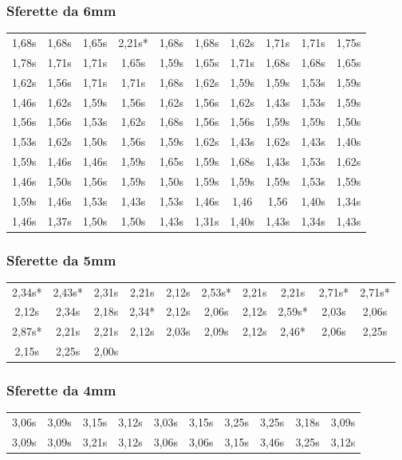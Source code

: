 \documentclass[a4paper,10pt]{report}
\begin{document}
\subsubsection{Sferette da 6mm}
\begin{tabular}{|c|c|c|c|c|c|c|c|c|c|}
\toprule
 1,68s & 1,68s & 1,65s & 2,21s* & 1,68s & 1,68s & 1,62s & 1,71s & 1,71s & 1,75s \\
 1,78s & 1,71s & 1,71s & 1,65s & 1,59s  & 1,65s  & 1,71s  & 1,68s & 1,68s & 1,65s \\
\midrule
 1,62s & 1,56s & 1,71s & 1,71s & 1,68s & 1,62s & 1,59s & 1,59s & 1,53s & 1,59s \\
 1,46s & 1,62s & 1,59s & 1,56s & 1,62s & 1,56s & 1,62s & 1,43s & 1,53s & 1,59s \\
\midrule
 1,56s & 1,56s & 1,53s & 1,62s & 1,68s & 1,56s & 1,56s & 1,59s & 1,59s & 1,50s\\
 1,53s & 1,62s & 1,50s & 1,56s & 1,59s & 1,62s & 1,43s & 1,62s & 1,43s & 1,40s \\
\midrule
 1,59s & 1,46s & 1,46s & 1,59s & 1,65s & 1,59s & 1,68s & 1,43s & 1,53s & 1,62s \\
 1,46s & 1,50s & 1,56s & 1,59s & 1,50s & 1,59s  & 1,59s & 1,59s & 1,53s & 1,59s \\
\midrule
1,59s & 1,46s & 1,53s & 1,43s & 1,53s & 1,46s & 1,46 & 1,56 & 1,40s & 1,34s \\
1,46s & 1,37s  & 1,50s   & 1,50s  & 1,43s & 1,31s & 1,40s  & 1,43s  & 1,34s & 1,43s \\
\bottomrule
\end{tabular}
\subsubsection{Sferette da 5mm}
\begin{tabular}{|c|c|c|c|c|c|c|c|c|c|}
\toprule
 2,34s* & 2,43s* & 2,31s & 2,21s & 2,12s & 2,53s* & 2,21s & 2,21s & 2,71s* & 2,71s* \\
 2,12s & 2,34s & 2,18s & 2,34* & 2,12s & 2,06s & 2,12s & 2,59s* & 2,03s & 2,06s \\
\midrule
 2,87s* & 2,21s & 2,21s & 2,12s & 2,03s & 2,09s & 2,12s & 2,46* & 2,06s & 2,25s \\
 2,15s & 2,25s & 2,00s &  &  &  &  &  &  & \\
\bottomrule
\end{tabular}
\subsubsection{Sferette da 4mm}
\begin{tabular}{|c|c|c|c|c|c|c|c|c|c|}
\toprule
 3,06s & 3,09s & 3,15s & 3,12s & 3,03s & 3,15s & 3,25s & 3,25s & 3,18s & 3,09s \\
 3,09s & 3,09s & 3,21s & 3,12s & 3,06s & 3,06s & 3,15s & 3,46s & 3,25s & 3,12s \\
\bottomrule
\end{tabular}
\end{document}
